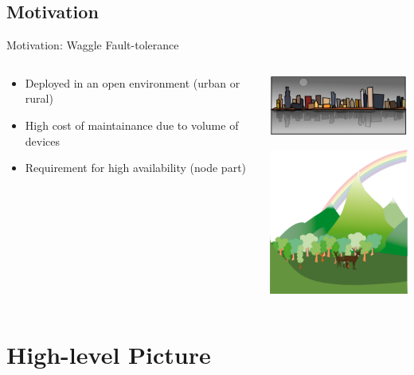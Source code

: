 \documentclass{beamer}
\begin{document}
\subsection{Motivation}
\begin{frame}{Motivation: Waggle Fault-tolerance}
  \begin{columns}[C] %
    \begin{column}{5cm} %
      \begin{itemize}
      \item Deployed in an open environment (urban or rural)
      \item High cost of maintainance due to volume of devices
      \item Requirement for high availability (node part)
      \end{itemize}
    \end{column}
    \begin{column}{5cm} %
      \includegraphics[width=5cm]{images/chicago.eps}

      \includegraphics[width=5cm]{images/montagne.eps}
    \end{column}
  \end{columns}
\end{frame}

\section{High-level Picture}
\end{document}
